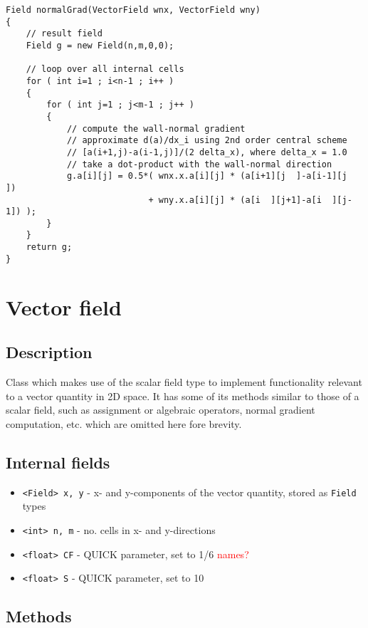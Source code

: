 \documentclass[notitlepage]{article}
\begin{document}
\begin{lstlisting}[style=myCpp]
Field normalGrad(VectorField wnx, VectorField wny)
{
	// result field
	Field g = new Field(n,m,0,0);
	
	// loop over all internal cells
	for ( int i=1 ; i<n-1 ; i++ )
	{
		for ( int j=1 ; j<m-1 ; j++ )
		{
			// compute the wall-normal gradient
			// approximate d(a)/dx_i using 2nd order central scheme
			// [a(i+1,j)-a(i-1,j)]/(2 delta_x), where delta_x = 1.0
			// take a dot-product with the wall-normal direction
			g.a[i][j] = 0.5*( wnx.x.a[i][j] * (a[i+1][j  ]-a[i-1][j  ])
							+ wny.x.a[i][j] * (a[i  ][j+1]-a[i  ][j-1]) );
		}
	}
	return g;
}
\end{lstlisting}

\section{Vector field}

\subsection{Description}

Class which makes use of the scalar field type to implement functionality
relevant to a vector quantity in 2D space.
It has some of its methods similar to those of a scalar field, such as assignment
or algebraic operators, normal gradient computation, etc. which are omitted here
fore brevity.

\subsection{Internal fields}

\begin{itemize}
\item \texttt{<Field> x, y} - x- and y-components of the vector quantity, stored
	as \texttt{Field} types
\item \texttt{<int> n, m} - no. cells in x- and y-directions
\item \texttt{<float> CF} - QUICK parameter, set to 1/6 \textcolor{red}{names?}
\item \texttt{<float> S} - QUICK parameter, set to 10
\end{itemize}

\subsection{Methods}
\end{document}
